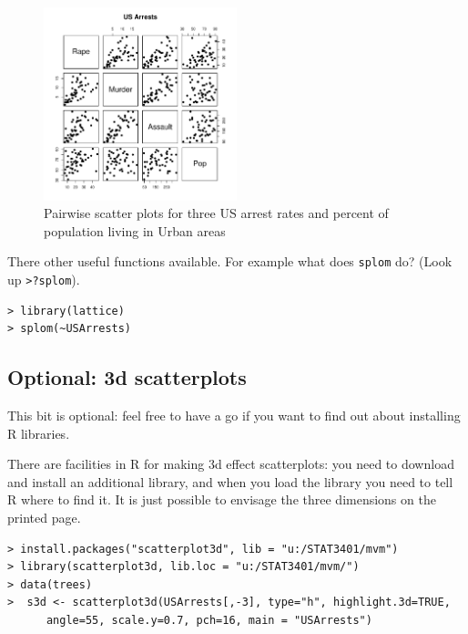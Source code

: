\begin{figure}
\begin{center}
\includegraphics[width = 0.5\textwidth]{images/pairs}
\caption{Pairwise scatter plots for three US arrest rates and percent of population living in Urban areas}
\end{center}
\end{figure}

There other useful functions available.   For example what does \texttt{splom} do?    (Look up \texttt{>?splom}).

\singlespacing
\begin{verbatim}
> library(lattice)
> splom(~USArrests)
\end{verbatim}
\onehalfspacing


\subsection{Optional: 3d scatterplots}

This bit is optional: feel free to have a go if you want to find out about installing R libraries.   

There are facilities in R for making 3d effect scatterplots: you need to download and install an additional library, and when you load the library you need to tell R where to find it.   It is just possible to envisage the three dimensions on the printed page.

\singlespacing
\begin{verbatim}
> install.packages("scatterplot3d", lib = "u:/STAT3401/mvm")
> library(scatterplot3d, lib.loc = "u:/STAT3401/mvm/")
> data(trees)
>  s3d <- scatterplot3d(USArrests[,-3], type="h", highlight.3d=TRUE,
      angle=55, scale.y=0.7, pch=16, main = "USArrests")
\end{verbatim}
\onehalfspacing

